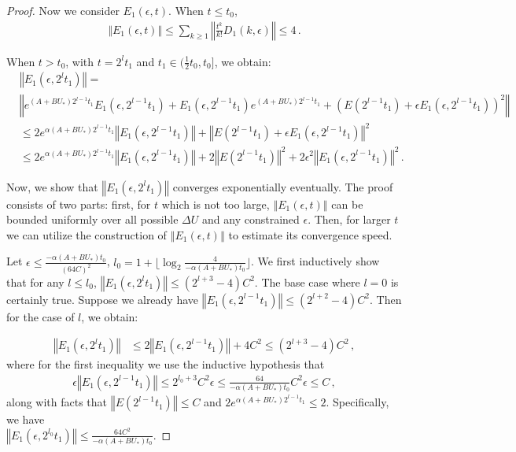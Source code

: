 \documentclass{article}
\theoremstyle{definition}
\begin{document}
\begin{proof}
Now we consider $E_{1}(\epsilon,t)$. When $t\leq t_{0}$,
\begin{align*}
\Vert E_{1}(\epsilon,t)\Vert \leq \sum_{k\geq 1}\left\Vert \frac{t^{k}}{k!}D_{1}(k,\epsilon)\right\Vert \leq 4\,.
\end{align*}

When $t>t_{0}$, with $t=2^{l}t_{1}$ and $t_{1}\in(\frac{1}{2}t_{0},t_{0}]$, we obtain:
\begin{align*}
&\left\Vert E_{1}(\epsilon,2^{l}t_{1})\right\Vert= \\
&\left\Vert e^{(A+BU_{*})2^{l-1}t_{1}}E_{1}(\epsilon, 2^{l-1}t_{1})+E_{1}(\epsilon, 2^{l-1}t_{1})e^{(A+BU_{*})2^{l-1}t_{1}}+\left(E(2^{l-1}t_{1})+\epsilon E_{1}(\epsilon,2^{l-1}t_{1})\right)^{2}\right\Vert \\
&\leq 2e^{\alpha(A+BU_{*})2^{l-1}t_{1}}\left\Vert E_{1}(\epsilon,2^{l-1}t_{1})\right\Vert +\left\Vert E(2^{l-1}t_{1})+\epsilon E_{1}(\epsilon,2^{l-1}t_{1})\right\Vert ^{2}\\
&\leq 2e^{\alpha(A+BU_{*})2^{l-1}t_{1}}\left\Vert E_{1}(\epsilon,2^{l-1}t_{1})\right\Vert +2\left\Vert E(2^{l-1}t_{1})\right\Vert ^{2}+2\epsilon^{2}\left\Vert E_{1}(\epsilon,2^{l-1}t_{1})\right\Vert ^{2}\,.
\end{align*}

Now, we show that $\left\Vert E_{1}(\epsilon,2^{l}t_{1})\right\Vert$ converges exponentially eventually. The proof consists of two parts: first, for $t$ which is not too large, $\left\Vert E_{1}(\epsilon,t)\right\Vert$ can be bounded uniformly over all possible $\Delta U$ and any constrained $\epsilon$. Then, for larger $t$ we can utilize the construction of $\left\Vert E_{1}(\epsilon,t)\right\Vert$ to estimate its convergence speed.  

Let $\epsilon\leq\frac{-\alpha(A+BU_{*})t_{0}}{(64C)^{2}}$, $l_{0}=1+\lfloor\log_{2}\frac{4}{-\alpha(A+BU_{*})t_{0}}\rfloor$. 
We first inductively show that for any $l\leq l_{0}$, $\left\Vert E_{1}(\epsilon,2^{l}t_{1})\right\Vert \leq (2^{l+3}-4)C^{2}$. The base case where $l=0$ is certainly true. Suppose we already have $\left\Vert E_{1}(\epsilon,2^{l-1}t_{1})\right\Vert \leq (2^{l+2}-4)C^{2}$. Then for the case of $l$, we obtain:

\begin{align*}
\left\Vert E_{1}(\epsilon,2^{l}t_{1})\right\Vert &\leq 2\left\Vert E_{1}(\epsilon,2^{l-1}t_{1})\right\Vert +4C^{2}\leq (2^{l+3}-4)C^{2}\,,
\end{align*}
where for the first inequality we use the inductive hypothesis that 
\begin{align*}
\epsilon\left\Vert E_{1}(\epsilon,2^{l-1}t_{1})\right\Vert\leq 2^{l_{0}+3}C^{2}\epsilon \leq \frac{64}{-\alpha(A+BU_{*})t_{0}}C^{2}\epsilon\leq C\,,
\end{align*}
along with facts that $\left\Vert E(2^{l-1}t_{1})\right\Vert\leq C$ and $2e^{\alpha(A+BU_{*})2^{l-1}t_{1}}\leq 2$.
Specifically, we have \\$\left\Vert E_{1}(\epsilon, 2^{l_{0}}t_{1})\right\Vert \leq \frac{64C^{2}}{-\alpha(A+BU_{*})t_{0}}$.


\end{proof}
\end{document}
